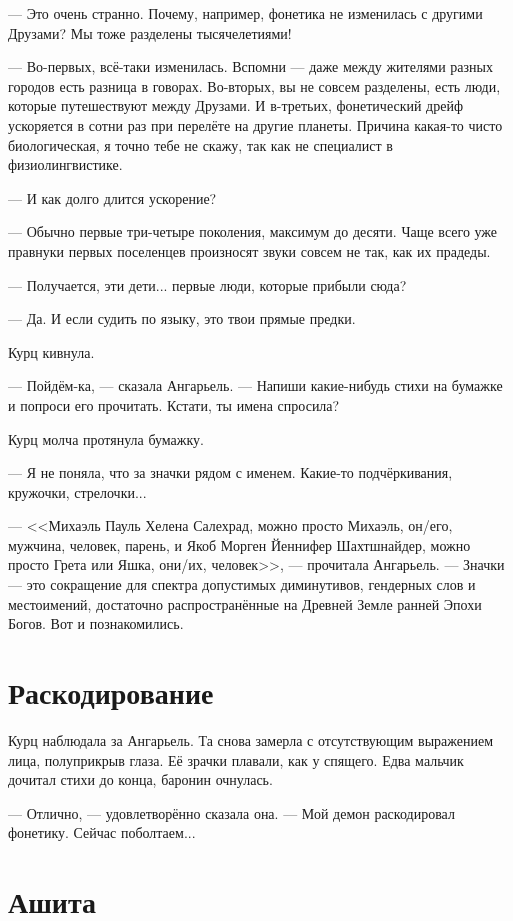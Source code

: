 --- Это очень странно.
Почему, например, фонетика не изменилась с другими Друзами?
Мы тоже разделены тысячелетиями!

--- Во-первых, всё-таки изменилась.
Вспомни --- даже между жителями разных городов есть разница в говорах.
Во-вторых, вы не совсем разделены, есть люди, которые путешествуют между Друзами.
И в-третьих, фонетический дрейф ускоряется в сотни раз при перелёте на другие планеты.
Причина какая-то чисто биологическая, я точно тебе не скажу, так как не специалист в физиолингвистике.

--- И как долго длится ускорение?

--- Обычно первые три-четыре поколения, максимум до десяти.
Чаще всего уже правнуки первых поселенцев произносят звуки совсем не так, как их прадеды.

--- Получается, эти дети... первые люди, которые прибыли сюда?

--- Да.
И если судить по языку, это твои прямые предки.

Курц кивнула.

--- Пойдём-ка, --- сказала Ангарьель.
--- Напиши какие-нибудь стихи на бумажке и попроси его прочитать.
Кстати, ты имена спросила?

Курц молча протянула бумажку.

--- Я не поняла, что за значки рядом с именем.
Какие-то подчёркивания, кружочки, стрелочки...

--- <<Михаэль Пауль Хелена Салехрад, можно просто Михаэль, он/его, мужчина, человек, парень, и Якоб Морген Йеннифер Шахтшнайдер, можно просто Грета или Яшка, они/их, человек>>, --- прочитала Ангарьель.
--- Значки --- это сокращение для спектра допустимых диминутивов, гендерных слов и местоимений, достаточно распространённые на Древней Земле ранней Эпохи Богов.
Вот и познакомились.

\section{Раскодирование}

Курц наблюдала за Ангарьель.
Та снова замерла с отсутствующим выражением лица, полуприкрыв глаза.
Её зрачки плавали, как у спящего.
Едва мальчик дочитал стихи до конца, баронин очнулась.

--- Отлично, --- удовлетворённо сказала она.
--- Мой демон раскодировал фонетику.
Сейчас поболтаем...

\section{Ашита}

